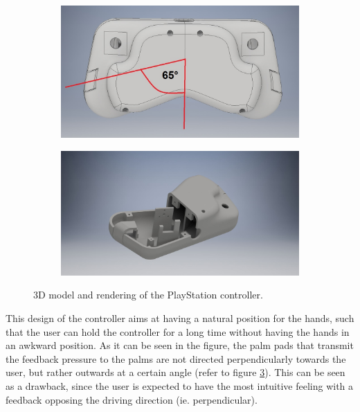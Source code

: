 \begin{figure}
    \centering
    \begin{minipage}{0.425\textwidth}
	    \begin{figure}[H]
		\centering
		\includegraphics[width=1.0\linewidth]{Figs/centric_shaft_controller_smaller_top_view_dir.jpg}
		\label{fig:PS_controller_smaller}
	\end{figure}
	\end{minipage}
	\begin{minipage}{0.45\textwidth}
	    \begin{figure}[H]
		\centering
		\includegraphics[width=1.0\linewidth]{Figs/PS_controller_smaller_open_rend.jpg}
		\label{fig:PS_controller_smaller_open_rend}
	    \end{figure}
	\end{minipage}
    
    \caption{3D model and rendering of the PlayStation controller.}
    \label{fig:PS_controller_design}
\end{figure}


This design of the controller aims at having a natural position for the hands, such that the user can hold the controller for a long time without having the hands in an awkward position. As it can be seen in the figure, the palm pads that transmit the feedback pressure to the palms are not directed perpendicularly towards the user, but rather outwards at a certain angle (refer to figure \ref{fig:PS_controller_design}). This can be seen as a drawback, since the user is expected to have the most intuitive feeling with a feedback opposing the driving direction (ie. perpendicular).

